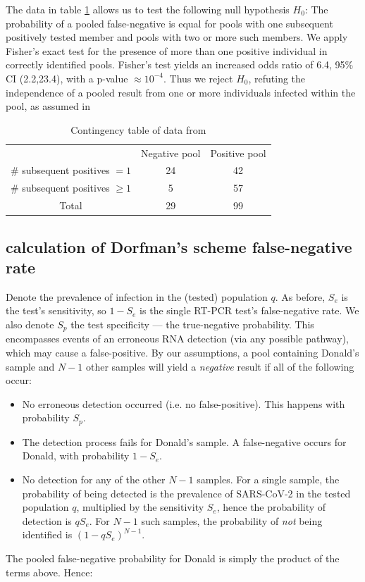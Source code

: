 \documentclass{article}
\newcommand{\Se}{S_e}
\newcommand{\Sp}{S_p}
\begin{document}
The data in table \ref{table} allows us to test the following null hypothesis $H_0$: The probability of a pooled false-negative is equal for pools with one subsequent positively tested member and pools with two or more such members. We apply Fisher's exact test for the presence of more than one positive individual in correctly identified pools. Fisher's test yields an increased odds ratio of 6.4, 95\% CI (2.2,23.4), with a p-value $\approx 10^{-4}$. Thus we reject $H_0$, refuting the independence of a pooled result from one or more individuals infected within the pool, as assumed in \cite{Simplistic1, Simplistic2, OptimalDorfmanPool, Kim}

\begin{table}[h]
\centering
\begin{tabular}{ c c c }
                                & Negative pool  & Positive pool \\%
\# subsequent positives $=1$    & 24             & 42            \\%
\# subsequent positives $\geq1$ & 5              & 57            \\%
 Total                          & 29             & 99            \\%
\end{tabular}
\caption{Contingency table of data from \cite{Salazar}}\label{table}
\end{table}


\subsection{calculation of Dorfman's scheme false-negative rate}\label{subsec:detailed}
Denote the prevalence of infection in the (tested) population $q$. As before, $\Se$ is the test's sensitivity, so $1-\Se$ is the single RT-PCR test's false-negative rate. We also denote $\Sp$ the test specificity --- the true-negative probability. This encompasses events of an erroneous RNA detection (via any possible pathway), which may cause a false-positive. By our assumptions, a pool containing Donald's sample and $N-1$ other samples will yield a \emph{negative} result if all of the following occur: 
\begin{itemize}
\item No erroneous detection occurred (i.e. no false-positive). This happens with probability $\Sp$.
\item The detection process fails for Donald's sample. A false-negative occurs for Donald, with probability $1-\Se$.
\item No detection for any of the other $N-1$ samples. For a single sample, the probability of being detected is the prevalence of SARS-CoV-2 in the tested population $q$, multiplied by the sensitivity $\Se$, hence the probability of detection is $q\Se$. For $N-1$ such samples, the probability of \emph{not} being identified is $(1-q\Se)^{N-1}$. 
\end{itemize}
The pooled false-negative probability for Donald is simply the product of the terms above. Hence:
\end{document}
